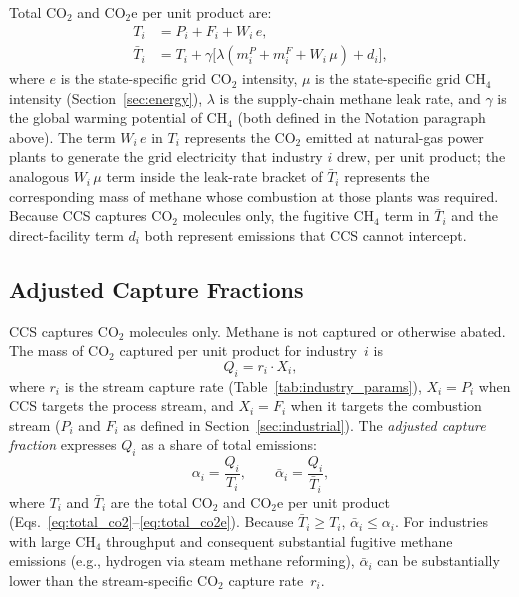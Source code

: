 \documentclass[11pt]{article}
\newcommand{\cotwo}{\ensuremath{\mathrm{CO_2}}}
\newcommand{\cotwoe}{\ensuremath{\mathrm{CO_{2}e}}}
\newcommand{\chfour}{\ensuremath{\mathrm{CH_4}}}
\begin{document}
Total \cotwo{} and \cotwoe{} per unit product are:
%
\begin{align}
  T_i &= P_i + F_i + W_i\,e, \label{eq:total_co2} \\
    \bar{T}_i &= T_i + \gamma\bigl[\lambda(m_i^P + m_i^F + W_i\,\mu) + d_i\bigr],
  \label{eq:total_co2e}
\end{align}
%
where $e$ is the state-specific grid \cotwo{} intensity, $\mu$ is the state-specific grid \chfour{} intensity (Section~\ref{sec:energy}), $\lambda$ is the supply-chain methane leak rate, and $\gamma$ is the global warming potential of \chfour{} (both defined in the Notation paragraph above). The term $W_i\,e$ in $T_i$ represents the \cotwo{} emitted at natural-gas power plants to generate the grid electricity that industry $i$ drew, per unit product; the analogous $W_i\,\mu$ term inside the leak-rate bracket of $\bar{T}_i$ represents the corresponding mass of methane whose combustion at those plants was required. Because CCS captures \cotwo{} molecules only, the fugitive \chfour{} term in $\bar{T}_i$ and the direct-facility term $d_i$ both represent emissions that CCS cannot intercept.

\subsection{Adjusted Capture Fractions}
\label{sec:adj_cf}

CCS captures \cotwo{} molecules only. Methane is not captured or otherwise abated.
The mass of \cotwo{} captured per unit product for industry~$i$ is
%
\begin{equation}
  Q_i = r_i \cdot X_i,
  \label{eq:co2_captured}
\end{equation}
%
where $r_i$ is the stream capture rate (Table~\ref{tab:industry_params}), $X_i = P_i$ when CCS targets the process stream, and $X_i = F_i$ when it targets the combustion stream ($P_i$ and $F_i$ as defined in Section~\ref{sec:industrial}).
The \emph{adjusted capture fraction} expresses $Q_i$ as a share of total emissions:
%
\begin{equation}
  \alpha_i = \frac{Q_i}{T_i}, \qquad
  \bar{\alpha}_i = \frac{Q_i}{\bar{T}_i},
  \label{eq:adj_cf}
\end{equation}
%
where $T_i$ and $\bar{T}_i$ are the total \cotwo{} and \cotwoe{} per unit product (Eqs.~\ref{eq:total_co2}--\ref{eq:total_co2e}).
Because $\bar{T}_i \geq T_i$, $\bar{\alpha}_i \leq \alpha_i$.
For industries with large \chfour{} throughput and consequent substantial fugitive methane emissions (e.g., hydrogen via steam methane reforming), $\bar{\alpha}_i$ can be substantially lower than the stream-specific \cotwo{} capture rate~$r_i$.
\end{document}
